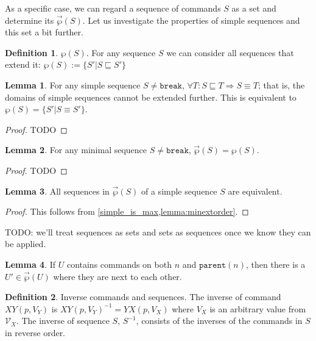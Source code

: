 \documentclass[12pt]{article}
\newcommand{\setvx}[1]{\mathcal{V}_{#1}}
\newcommand{\parent}{\mathtt{parent}}
\newcommand{\cbrk}{\mathtt{break}}
\newcommand{\fscommand}[2]{{#1#2}}
\newcommand{\cxy}{\fscommand{X}{Y}}
\newcommand{\cyx}{\fscommand{Y}{X}}
\newcommand{\eqext}{\sqsubseteq}
\newcommand{\extset}[1]{\wp({#1})}
\newcommand{\orderset}[1]{\vec{\wp}({#1})}
\theoremstyle{definition}
\newtheorem{mydef}{Definition}
\newtheorem{mylem}{Lemma}
\begin{document}
As a specific case, we can regard a sequence of commands $S$
as a set and determine its $\orderset{S}$.
Let us investigate the properties of simple sequences and this set a bit further.

\begin{mydef}{$\extset{S}$.}
For any sequence $S$ we can consider all sequences that extend it:
$\extset{S} := \{S'|S\eqext S'\}$
\end{mydef}


\begin{mylem}\label{simple_is_max}
For any simple sequence $S\neq\cbrk$, $\forall T: S\eqext T \Rightarrow S\equiv T$;
that is, the domains of simple sequences cannot be extended further.
This is equivalent to $\extset{S} = \{S'|S\equiv S'\}$.
\end{mylem}
\begin{proof}
TODO
\end{proof}

\begin{mylem}\label{lemma:minextorder}
For any minimal sequence $S\neq\cbrk$, $\orderset{S} = \extset{S}$.
\end{mylem}
\begin{proof}
TODO
\end{proof}

\begin{mylem}
All sequences in $\orderset{S}$ of a simple sequence $S$ are equivalent.
\end{mylem}
\begin{proof}
This follows from \cref{simple_is_max,lemma:minextorder}.
\end{proof}


TODO: we'll treat sequences as sets and sets as sequences
once we know they can be applied.

\begin{mylem}\label{lemma:neighbor}
If $U$ contains commands on both $n$ and $\parent(n)$, then
there is a $U'\in\orderset{U}$ where they are next to each other.
\end{mylem}










\begin{mydef}{Inverse commands and sequences.}
The inverse of command $\cxy(p,V_Y)$ is $\cxy(p,V_Y)^{-1} = \cyx(p,V_X)$
where $V_X$ is an arbitrary value from $\setvx{X}$.
The inverse of sequence $S$, $S^{-1}$, consists of the inverses of the commands in $S$
in reverse order.
\end{mydef}
\end{document}
